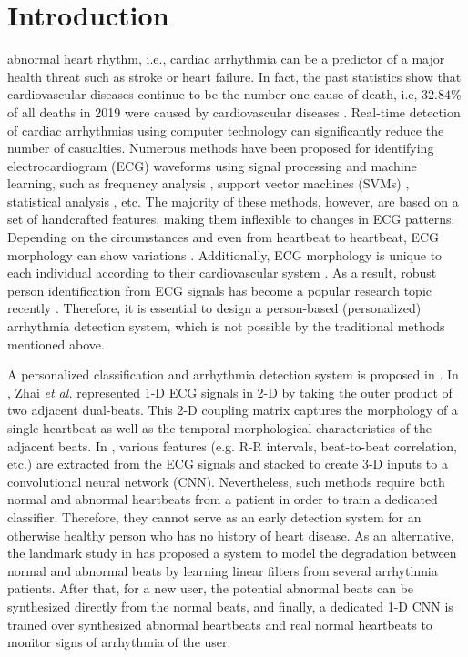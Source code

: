 \documentclass[journal,transmag]{IEEEtran}
\begin{document}
\section{Introduction}
 abnormal heart rhythm, i.e., cardiac arrhythmia can be a predictor of a major health threat such as stroke or heart failure. In fact, the past statistics show that cardiovascular diseases continue to be the number one cause of death, i.e, $32.84\%$ of all deaths in 2019 were caused by cardiovascular diseases \cite{murray2020global}. Real-time detection of cardiac arrhythmias using computer technology can significantly reduce the number of casualties. Numerous methods have been proposed for identifying electrocardiogram (ECG) waveforms using signal processing and machine learning, such as frequency analysis \cite{frequency}, support vector machines (SVMs) \cite{SVM}, statistical analysis \cite{statistical}, etc. The majority of these methods, however, are based on a set of handcrafted features, making them inflexible to changes in ECG patterns. Depending on the circumstances and even from heartbeat to heartbeat, ECG morphology can show variations \cite{hoekema2001geometrical}. Additionally, ECG morphology is unique to each individual according to their cardiovascular system \cite{ECGDataset1}. As a result, robust person identification from ECG signals has become a popular research topic recently \cite{ECGBiometrics1, ECGBiometrics2}. Therefore, it is essential to design a person-based (personalized) arrhythmia detection system, which is not possible by the traditional methods mentioned above. 

A personalized classification and arrhythmia detection system is proposed in \cite{kiranyaz2016real, patient_spesific1, patient_spesific2}. In \cite{zhai2018automated}, Zhai \textit{et al.} represented 1-D ECG signals in 2-D by taking the outer product of two adjacent dual-beats. This 2-D coupling matrix captures the morphology of a single heartbeat as well as the temporal morphological characteristics of the adjacent beats. In \cite{li2019automated}, various features (e.g. R-R intervals, beat-to-beat correlation, etc.) are extracted from the ECG signals and stacked to create 3-D inputs to a convolutional neural network (CNN). 
Nevertheless, such methods require both normal and abnormal heartbeats from a patient in order to train a dedicated classifier. Therefore, they cannot serve as an early detection system for an otherwise healthy person who has no history of heart disease. As an alternative, the landmark study in \cite{kiranyaz2017personalized} has proposed a system to model the degradation between normal and abnormal beats by learning linear filters from several arrhythmia patients. After that, for a new user, the potential abnormal beats can be synthesized directly from the normal beats, and finally, a dedicated 1-D CNN is trained over synthesized abnormal heartbeats and real normal heartbeats to monitor signs of arrhythmia of the user.
\end{document}
